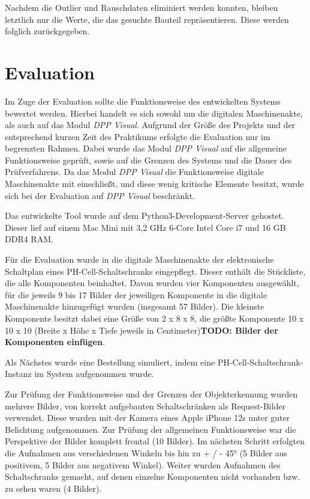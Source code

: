 \documentclass[
    type=Projektarbeit,
    status=draft, %
    language=german, %
    bibengine=bibtex,
]{unibwm-inf-thesis}
\newcommand{\todo}[1]{\textbf{TODO: #1}}
\begin{document}
    Nachdem die Outlier und Rauschdaten eliminiert werden konnten, bleiben letztlich nur die Werte, die das gesuchte Bauteil repräsentieren.
    Diese werden folglich zurückgegeben.


    \chapter{Evaluation}
    Im Zuge der Evaluation sollte die Funktionsweise des entwickelten Systems bewertet werden.
    Hierbei handelt es sich sowohl um die digitalen Maschinenakte, als auch auf das Modul \textit{DPP Visual}.
    Aufgrund der Größe des Projekts und der entsprechend kurzen Zeit des Praktikums erfolgte die Evaluation nur im begrenzten Rahmen.
    Dabei wurde das Modul \textit{DPP Visual} auf die allgemeine Funktionsweise geprüft, sowie auf die Grenzen des Systems und die Dauer des Prüfverfahrens.
    Da das Modul \textit{DPP Visual} die Funktionsweise digitale Maschinenakte mit einschließt, und diese wenig kritische Elemente besitzt, wurde sich bei der Evaluation auf \textit{DPP Visual} beschränkt.

    Das entwickelte Tool wurde auf dem Python3-Development-Server gehostet.
    Dieser lief auf einem Mac Mini mit 3,2 GHz 6-Core Intel Core i7 und 16 GB DDR4 RAM.

    Für die Evaluation wurde in die digitale Maschinenakte der elektronische Schaltplan eines PH-Cell-Schaltschranks eingepflegt.
    Dieser enthält die Stückliste, die alle Komponenten beinhaltet.
    Davon wurden vier Komponenten ausgewählt, für die jeweils 9 bis 17 Bilder der jeweiligen Komponente in die digitale Maschinenakte hinzugefügt wurden (insgesamt 57 Bilder).
    Die kleinste Komponente besitzt dabei eine Größe von 2 x 8 x 8, die größte Komponente 10 x 10 x 10 (Breite x Höhe x Tiefe jeweils in Centimeter)\todo{Bilder der Komponenten einfügen}.

    Als Nächstes wurde eine Bestellung simuliert, indem eine PH-Cell-Schaltschrank-Instanz im System aufgenommen wurde.

    Zur Prüfung der Funktionsweise und der Grenzen der Objekterkennung wurden mehrere Bilder, von korrekt aufgebauten Schaltschränken als Request-Bilder verwendet.
    Diese wurden mit der Kamera eines Apple iPhone 12s unter guter Belichtung aufgenommen.
    Zur Prüfung der allgemeinen Funktionsweise war die Perspektive der Bilder komplett frontal (10 Bilder).
    Im nächsten Schritt erfolgten die Aufnahmen aus verschiedenen Winkeln bis hin zu + / - 45° (5 Bilder aus positivem, 5 Bilder aus negativem Winkel).
    Weiter wurden Aufnahmen des Schaltschranks gemacht, auf denen einzelne Komponenten nicht vorhanden bzw. zu sehen waren (4 Bilder).
\end{document}
